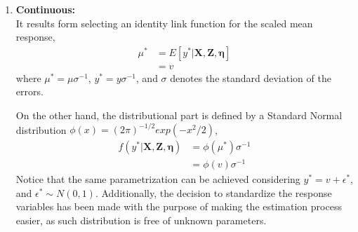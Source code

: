 \begin{enumerate}
	
	\item \textbf{Continuous:} \\
	It results form selecting an identity link function for the scaled mean response,
	\begin{equation} \label{eq:link_cont}
		\begin{split}
			\mu^{*} &= E[y^{*} | \mathbf{X}, \mathbf{Z}, \pmb{\eta}] \\ 
			&= v
		\end{split}
	\end{equation}
	where $\mu^{*} = \mu \sigma^{-1}$, $y^{*} = y \sigma^{-1}$, and $\sigma$ denotes the standard deviation of the errors.
	
	On the other hand, the distributional part is defined by a Standard Normal distribution $\phi(x)=(2 \pi)^{-1/2} exp(-x^{2}/2)$,
	\begin{equation} \label{eq:dist_cont}
		\begin{split}
			f(y^{*}| \mathbf{X}, \mathbf{Z}, \pmb{\eta}) &= \phi(\mu^{*}) \sigma^{-1} \\
			&= \phi(v) \sigma^{-1}
		\end{split}
	\end{equation}
	Notice that the same parametrization can be achieved considering $y^{*} = v + \epsilon^{*}$, and $\epsilon^{*} \sim N(0, 1)$.
	Additionally, the decision to standardize the response variables has been made with the purpose of making the estimation process easier, as such distribution is free of unknown parameters.
	
	

\end{enumerate}
